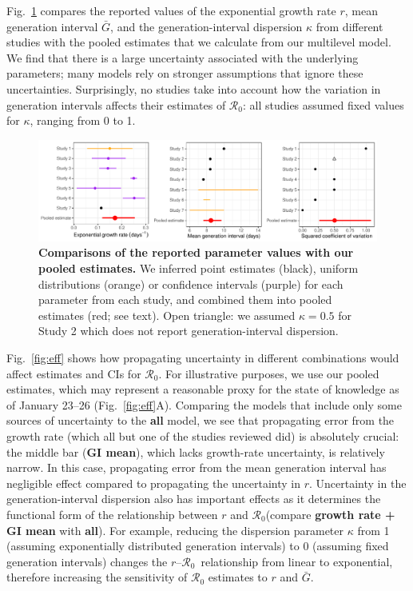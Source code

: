 \documentclass[12pt]{article}
\newcommand{\fref}[1]{Fig.~\ref{fig:#1}}
\newcommand{\Ro}{\ensuremath{{\mathcal R}_{0}}\xspace}
\begin{document}
\fref{assumption} compares the reported values of the exponential growth rate $r$, mean generation interval $\bar G$, and the generation-interval dispersion $\kappa$ from different studies with the pooled estimates that we calculate from our multilevel model.
We find that there is a large uncertainty associated with the underlying parameters;
many models rely on stronger assumptions that ignore these uncertainties.
Surprisingly, no studies take into account how the variation in generation intervals affects their estimates of \Ro:
all studies assumed fixed values for $\kappa$, ranging from 0 to 1.

\begin{figure}[t]
\includegraphics[width=\textwidth]{compare_assumption.pdf}
\caption{
\textbf{Comparisons of the reported parameter values with our pooled estimates.}
We inferred point estimates (black), uniform distributions (orange) or confidence intervals (purple) for each parameter from each study, and combined them into pooled estimates (red; see text).
Open triangle: we assumed $\kappa=0.5$ for Study 2 which does not report generation-interval dispersion.
}
\label{fig:assumption}
\end{figure}

\fref{eff} shows how propagating uncertainty in different combinations would affect estimates and CIs for \Ro. For illustrative purposes, we use our pooled estimates, which may represent a reasonable proxy for the state of knowledge as of January 23--26 (\fref{eff}A).
Comparing the models that include only some sources of uncertainty to the \textbf{all} model, we see that propagating error from the growth rate (which all but one of the studies reviewed did) is absolutely crucial: the middle bar (\textbf{GI mean}), which lacks growth-rate uncertainty, is relatively narrow.
In this case, propagating error from the mean generation interval has negligible effect compared to propagating the uncertainty in $r$.
Uncertainty in the generation-interval dispersion also has important effects as it determines the functional form of the relationship between $r$ and \Ro (compare \textbf{growth rate + GI mean} with \textbf{all}).
For example, reducing the dispersion parameter $\kappa$ from 1 (assuming exponentially distributed generation intervals) to 0 (assuming fixed generation intervals) changes the $r$--\Ro\ relationship from linear to exponential, therefore increasing the sensitivity of \Ro estimates to $r$ and $\bar G$.
\end{document}
